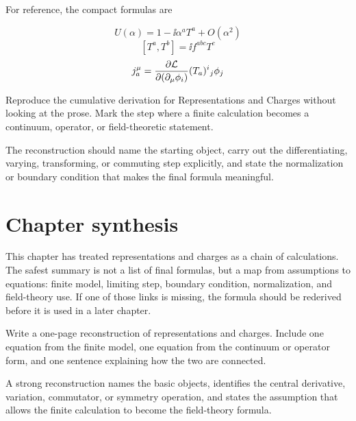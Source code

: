 For reference, the compact formulas are

\[
  U(\alpha)=1-\ii\alpha^aT^a+O(\alpha^2)
\]
\[
  [T^a,T^b]=\ii f^{abc}T^c
\]
\[
  j^\mu_a=\frac{\partial\mathcal L}{\partial(\partial_\mu\phi_i)}(T_a)^i{}_j\phi_j
\]

\begin{exercise}
Reproduce the cumulative derivation for Representations and Charges without looking at the prose.  Mark the step where a finite calculation becomes a continuum, operator, or field-theoretic statement.
\begin{answer}
The reconstruction should name the starting object, carry out the differentiating, varying, transforming, or commuting step explicitly, and state the normalization or boundary condition that makes the final formula meaningful.
\end{answer}
\end{exercise}



\section{Chapter synthesis}

This chapter has treated representations and charges as a chain of calculations.  The safest summary is not a list of final formulas, but a map from assumptions to equations: finite model, limiting step, boundary condition, normalization, and field-theory use.  If one of those links is missing, the formula should be rederived before it is used in a later chapter.

\begin{exercise}
Write a one-page reconstruction of representations and charges.  Include one equation from the finite model, one equation from the continuum or operator form, and one sentence explaining how the two are connected.
\begin{answer}
A strong reconstruction names the basic objects, identifies the central derivative, variation, commutator, or symmetry operation, and states the assumption that allows the finite calculation to become the field-theory formula.
\end{answer}
\end{exercise}

